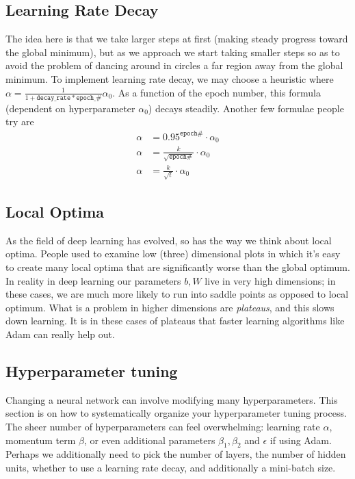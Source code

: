 \documentclass[12pt]{article}
\begin{document}
\subsection{Learning Rate Decay} The idea here is that we take larger steps at first (making steady progress toward the global minimum), but as we approach we start taking smaller steps so as to avoid the problem of dancing around in circles a far region away from the global minimum. To implement learning rate decay, we may choose a heuristic where $\alpha = \frac{1}{1 + \texttt{decay\_rate}*\texttt{epoch\_\#}} \alpha_0$. As a function of the epoch number, this formula (dependent on hyperparameter $\alpha_0$) decays steadily. Another few formulae people try are
\begin{align*}   \alpha &= 0.95^{\texttt{epoch\#}} \cdot \alpha_0 \\
  \alpha &= \frac{k}{\sqrt{\texttt{epoch\#}}} \cdot \alpha_0 \\
  \alpha &= \frac{k}{\sqrt{t}} \cdot \alpha_0 \end{align*}

\subsection{Local Optima} As the field of deep learning has evolved, so has the way we think about local optima. People used to examine low (three) dimensional plots in which it's easy to create many local optima that are significantly worse than the global optimum. In reality in deep learning our parameters $b, W$ live in very high dimensions; in these cases, we are much more likely to run into saddle points as opposed to local optimum. What is a problem in higher dimensions are \emph{plateaus}, and this slows down learning. It is in these cases of plateaus that faster learning algorithms like Adam can really help out.

\subsection{Hyperparameter tuning} Changing a neural network can involve modifying many hyperparameters.
This section is on how to systematically organize your hyperparameter tuning process. The sheer number of hyperparameters
can feel overwhelming: learning rate $\alpha$, momentum term $\beta$, or even additional parameters $\beta_1, \beta_2$ and $\epsilon$ 
if using Adam. Perhaps we additionally need to pick the number of layers, the number of hidden units, whether to use a learning
rate decay, and additionally a mini-batch size.
\end{document}
